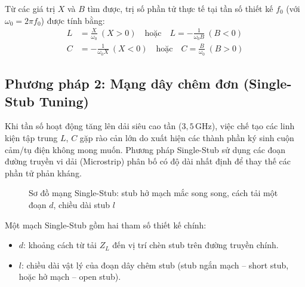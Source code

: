 \documentclass[a4paper]{report}
\newcommand\ZL{Z_L}
\newcommand\GHz{\,\mathrm{GHz}}
\begin{document}
Từ các giá trị $X$ và $B$ tìm được, trị số phần tử thực tế tại tần số thiết kế $f_0$ (với $\omega_0=2\pi f_0$) được tính bằng:
\begin{align}
  L &= \frac{X}{\omega_0}\ (X>0) \quad\text{hoặc}\quad L=-\frac{1}{\omega_0 B}\ (B<0)\\
  C &= -\frac{1}{\omega_0 X}\ (X<0) \quad\text{hoặc}\quad C=\frac{B}{\omega_0}\ (B>0)
\end{align}

\subsection{Phương pháp 2: Mạng dây chêm đơn (Single-Stub Tuning)}
Khi tần số hoạt động tăng lên dải siêu cao tần ($3{,}5\GHz$), việc chế tạo các linh kiện tập trung $L$, $C$ gặp rào cản lớn do xuất hiện các thành phần ký sinh cuộn cảm/tụ điện không mong muốn. Phương pháp Single-Stub sử dụng các đoạn đường truyền vi dải (Microstrip) phân bố có độ dài nhất định để thay thế các phần tử phản kháng.

\begin{figure}[H]\centering
{}
\caption{Sơ đồ mạng Single-Stub: stub hở mạch mắc song song, cách tải một đoạn $d$, chiều dài stub $l$}
\end{figure}

Một mạch Single-Stub gồm hai tham số thiết kế chính:
\begin{itemize}
  \item $d$: khoảng cách từ tải $\ZL$ đến vị trí chèn stub trên đường truyền chính.
  \item $l$: chiều dài vật lý của đoạn dây chêm stub (stub ngắn mạch – short stub, hoặc hở mạch – open stub).
\end{itemize}
\end{document}

